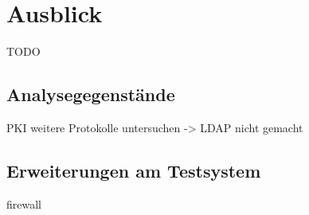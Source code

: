 \chapter{Ausblick}
TODO

\section{Analysegegenstände}
PKI
weitere Protokolle untersuchen -> LDAP nicht gemacht

\section{Erweiterungen am Testsystem}

firewall